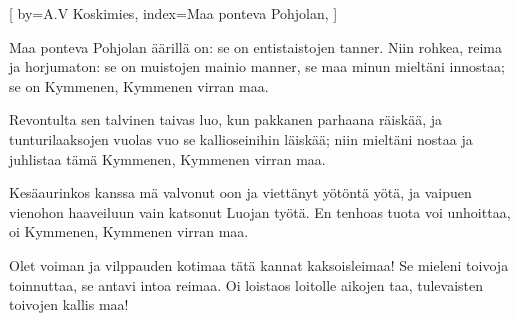 

[
by={A.V Koskimies},
index={Maa ponteva Pohjolan},
]

\beginverse*
Maa ponteva Pohjolan äärillä on:
se on entistaistojen tanner.
Niin rohkea, reima ja horjumaton: 
se on muistojen mainio manner,
se maa minun mieltäni innostaa; 
se on Kymmenen, Kymmenen virran maa.
\endverse

\beginverse*
Revontulta sen talvinen taivas luo, 
kun pakkanen parhaana räiskää,
ja tunturilaaksojen vuolas vuo
se kallioseinihin läiskää;
niin mieltäni nostaa ja juhlistaa 
tämä Kymmenen, Kymmenen virran maa. 
\endverse

\beginverse* 
Kesäaurinkos kanssa mä valvonut oon 
ja viettänyt yötöntä yötä, 
ja vaipuen vienohon haaveiluun 
vain katsonut Luojan työtä. 
En tenhoas tuota voi unhoittaa, 
oi Kymmenen, Kymmenen virran maa. 
\endverse

\beginverse* 
Olet voiman ja vilppauden kotimaa 
tätä kannat kaksoisleimaa!
Se mieleni toivoja toinnuttaa, 
se antavi intoa reimaa. 
Oi loistaos loitolle aikojen taa, 
tulevaisten toivojen kallis maa! 
\endverse
\endsong


